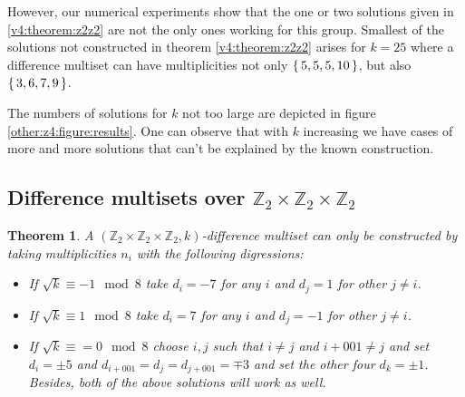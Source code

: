 \documentclass{article}
\theoremstyle{plain}
\newtheorem{theorem}{Theorem}[section]
\theoremstyle{definition}
\theoremstyle{remark}
\begin{document}
			However, our numerical experiments show that the one or two solutions given in \ref{v4:theorem:z2z2} are not the only ones working for this group. Smallest of the solutions not constructed in theorem \ref{v4:theorem:z2z2} arises for $k=25$ where a difference multiset can have multiplicities not only $\set{5,5,5,10}$, but also $\set{3,6,7,9}$. 

			The numbers of solutions for $k$ not too large are depicted in figure \ref{other:z4:figure:results}. One can observe that with $k$ increasing we have cases of more and more solutions that can't be explained by the known construction.
			
		\subsection{Difference multisets over $\mathbb Z_2 \times \mathbb Z_2 \times \mathbb Z_2$}
			\begin{theorem}
				A $(\mathbb Z_2 \times \mathbb Z_2 \times \mathbb Z_2, k)$-difference multiset can only be constructed by taking multiplicities $n_i$ with the following digressions:
				\begin{itemize}
					\item If $\sqrt k \equiv -1 \mod 8$ take $d_i=-7$ for any $i$ and $d_j=1$ for other $j\neq i$.
					\item If $\sqrt k \equiv 1 \mod 8$ take $d_i=7$ for any $i$ and $d_j=-1$ for other $j\neq i$.
					\item If $\sqrt k \equiv = 0 \mod 8$ choose $i, j$ such that $i \neq j$ and $i+001 \neq j$ and set $d_i=\pm 5$ and $d_{i+001}=d_j=d_{j+001}=\mp 3$ and set the other four $d_k = \pm 1$. Besides, both of the above solutions will work as well.
				\end{itemize}
			\end{theorem}
			
\end{document}
